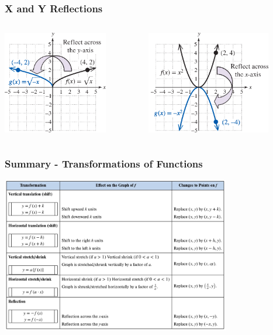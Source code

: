 \documentclass{beamer}
\begin{document}
\begin{frame}\frametitle{X and Y Reflections}
\begin{columns}
\begin{column}{5.5cm}
\begin{center}
\includegraphics[height=4.5cm]{fig/reflectX.png}
\end{center}
\end{column}
\begin{column}{5.5cm}
\begin{center}
\includegraphics[height=4.5cm]{fig/reflectY.png}
\end{center}
\end{column}
\end{columns}
\end{frame}

\begin{frame}\frametitle{Summary - Transformations of Functions}
\begin{center}
\includegraphics[width=10cm]{fig/transform.jpg}
\end{center}
\end{frame}
\end{document}
